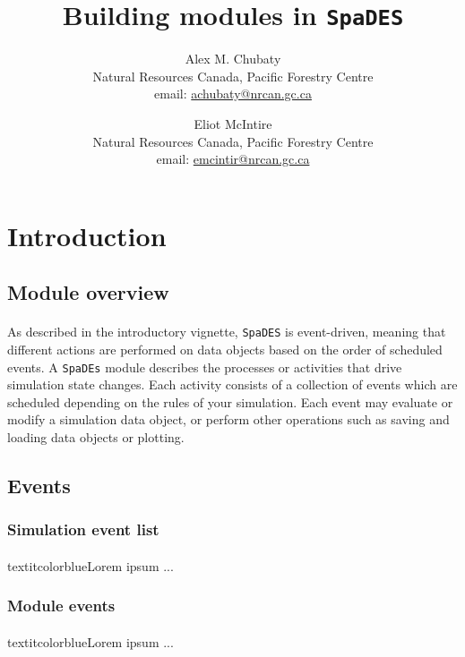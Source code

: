 \documentclass{article}
\title{Building modules in \texttt{SpaDES}}
\author{
  Alex M. Chubaty\\
  \small{Natural Resources Canada, Pacific Forestry Centre}\\
  \small{email: \href{mailto:achubaty@nrcan.gc.ca}{achubaty@nrcan.gc.ca}}
  \and
  Eliot McIntire\\
	\small{Natural Resources Canada, Pacific Forestry Centre}\\
	\small{email: \href{mailto:emcintir@nrcan.gc.ca}{emcintir@nrcan.gc.ca}}
}
\begin{document}


\maketitle

\tableofcontents

\newpage

\section{Introduction}

\subsection{Module overview}

\paragraph{}
As described in the introductory vignette, \texttt{SpaDES} is event-driven, meaning that different actions are performed on data objects based on the order of scheduled events. A \texttt{SpaDEs} module describes the processes or activities that drive simulation state changes. Each activity consists of a collection of events which are scheduled depending on the rules of your simulation. Each event may evaluate or modify a simulation data object, or perform other operations such as saving and loading data objects or plotting.

\subsection{Events}

\subsubsection{Simulation event list}

\paragraph{}
textit{color{blue}{Lorem ipsum ...}}

\subsubsection{Module events}

\paragraph{}
textit{color{blue}{Lorem ipsum ...}}
\end{document}
